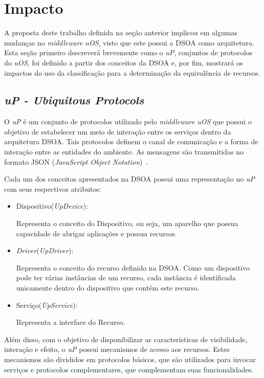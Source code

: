 \section{Impacto}
\label{sec:impactoUOS}

A proposta deste trabalho definida na seção anterior implicou em algumas mudanças no \emph{middleware uOS}, visto que este possui a DSOA como arquitetura. Esta seção primeiro descreverá brevemente como o \emph{uP}, conjuntos de protocolos do \emph{uOS}, foi definido a partir dos conceitos da DSOA e, por fim, mostrará os impactos do uso da classificação para a determinação da equivalência de recursos.

\subsection{\emph{uP - Ubiquitous Protocols}}

O \emph{uP} é um conjunto de protocolos utilizado pelo \emph{middleware uOS} que possui o objetivo de estabelecer um meio de interação entre os serviços dentro da arquitetura DSOA. Tais protocolos definem o canal de comunicação e a forma de interação entre as entidades do ambiente. As mensagens são transmitidas no formato JSON (\emph{JavaScript Object Notation})~\cite{json}.

Cada um dos conceitos apresentados na DSOA possui uma representação no \emph{uP} com seus respectivos atributos:

\begin{itemize}
	\item Dispositivo(\emph{UpDevice}):

		Representa o conceito do Dispositivo, ou seja, um aparelho que possua capacidade de abrigar aplicações e possua recursos.

	\item \emph{Driver}(\emph{UpDriver}): 

		Representa o conceito do recurso definido na DSOA. Como um dispositivo pode ter várias instâncias de um recurso, cada instância é identificada unicamente dentro do dispositivo que contém este recurso.

	\item Serviço(\emph{UpService}): 

		Representa a interface do Recurso.
\end{itemize}

Além disso, com o objetivo de disponibilizar as características de visibilidade, interação e efeito, o \emph{uP} possui mecanismos de acesso aos recursos. Estes mecanismos são divididos em protocolos básicos, que são utilizados para invocar serviços e protocolos complementares, que complementam suas funcionalidades.

